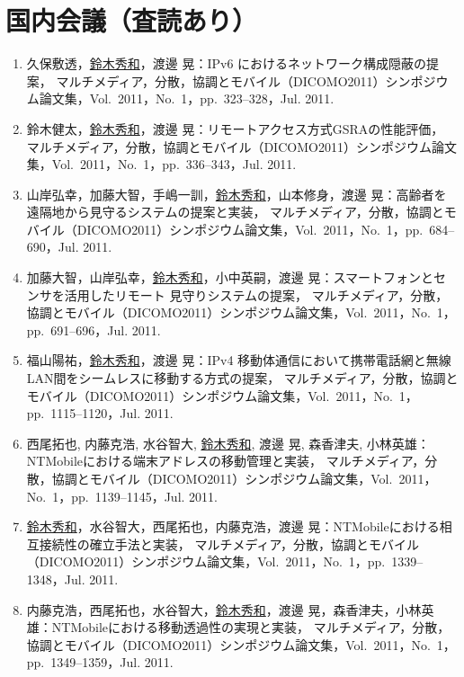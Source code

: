 \section*{国内会議（査読あり）}
\begin{enumerate}
\item 久保敷透，\underline{鈴木秀和}，渡邊 晃：IPv6 におけるネットワーク構成隠蔽の提案，
マルチメディア，分散，協調とモバイル（DICOMO2011）シンポジウム論文集，Vol.~2011，No.~1，pp.\ 323--328，Jul. 2011.

\item 鈴木健太，\underline{鈴木秀和}，渡邊 晃：リモートアクセス方式GSRAの性能評価，
マルチメディア，分散，協調とモバイル（DICOMO2011）シンポジウム論文集，Vol.~2011，No.~1，pp.\ 336--343，Jul. 2011.

\item 山岸弘幸，加藤大智，手嶋一訓，\underline{鈴木秀和}，山本修身，渡邊 晃：高齢者を遠隔地から見守るシステムの提案と実装，
マルチメディア，分散，協調とモバイル（DICOMO2011）シンポジウム論文集，Vol.~2011，No.~1，pp.\ 684--690，Jul. 2011.

\item 加藤大智，山岸弘幸，\underline{鈴木秀和}，小中英嗣，渡邊 晃：スマートフォンとセンサを活用したリモート 見守りシステムの提案，
マルチメディア，分散，協調とモバイル（DICOMO2011）シンポジウム論文集，Vol.~2011，No.~1，pp.\ 691--696，Jul. 2011.

\item 福山陽祐，\underline{鈴木秀和}，渡邊 晃：IPv4 移動体通信において携帯電話網と無線LAN間をシームレスに移動する方式の提案，
マルチメディア，分散，協調とモバイル（DICOMO2011）シンポジウム論文集，Vol.~2011，No.~1，pp.\ 1115--1120，Jul. 2011.

\item 西尾拓也, 内藤克浩, 水谷智大, \underline{鈴木秀和}, 渡邊 晃, 森香津夫, 小林英雄：NTMobileにおける端末アドレスの移動管理と実装，
マルチメディア，分散，協調とモバイル（DICOMO2011）シンポジウム論文集，Vol.~2011，No.~1，pp.\ 1139--1145，Jul. 2011.

\item \underline{鈴木秀和}，水谷智大，西尾拓也，内藤克浩，渡邊 晃：NTMobileにおける相互接続性の確立手法と実装，
マルチメディア，分散，協調とモバイル（DICOMO2011）シンポジウム論文集，Vol.~2011，No.~1，pp.\ 1339--1348，Jul. 2011.

\item 内藤克浩，西尾拓也，水谷智大，\underline{鈴木秀和}，渡邊 晃，森香津夫，小林英雄：NTMobileにおける移動透過性の実現と実装，
マルチメディア，分散，協調とモバイル（DICOMO2011）シンポジウム論文集，Vol.~2011，No.~1，pp.\ 1349--1359，Jul. 2011.
\end{enumerate}


